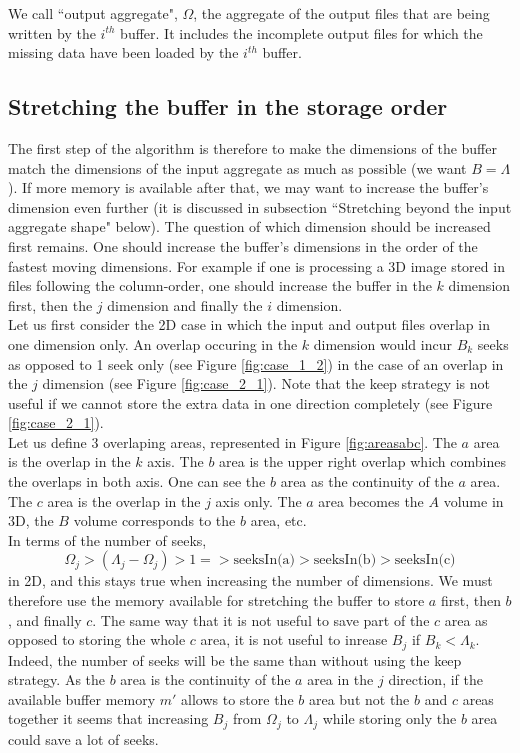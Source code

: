 \documentclass[conference]{IEEEtran}
\begin{document}
We call ``output aggregate", $\Omega$, the aggregate of the output files that are being written by the $i^{th}$ buffer. It includes the incomplete output files for which the missing data have been loaded by the $i^{th}$ buffer. \\

\subsection{Stretching the buffer in the storage order}
The first step of the algorithm is therefore to make the dimensions of the buffer match the dimensions of the input aggregate as much as possible (we want $B=\Lambda$).
If more memory is available after that, we may want to increase the buffer's dimension even further (it is discussed in subsection ``Stretching beyond the input aggregate shape" below).
The question of which dimension should be increased first remains.
One should increase the buffer's dimensions in the order of the fastest moving dimensions.
For example if one is processing a 3D image stored in files following the column-order, one should increase the buffer in the $k$ dimension first, then the $j$ dimension and finally the $i$ dimension. \\

Let us first consider the 2D case in which the input and output files overlap in one dimension only.
An overlap occuring in the $k$ dimension would incur $B_k$ seeks as opposed to 1 seek only (see Figure \ref{fig:case_1_2}) in the case of an overlap in the $j$ dimension (see Figure \ref{fig:case_2_1}).
Note that the keep strategy is not useful if we cannot store the extra data in one direction completely (see Figure \ref{fig:case_2_1}). \\

Let us define 3 overlaping areas, represented in Figure \ref{fig:areasabc}.
The $a$ area is the overlap in the $k$ axis.
The $b$ area is the upper right overlap which combines the overlaps in both axis.
One can see the $b$ area as the continuity of the $a$ area.
The $c$ area is the overlap in the $j$ axis only.
The $a$ area becomes the $A$ volume in 3D, the $B$ volume corresponds to the $b$ area, etc. \\

In terms of the number of seeks, $$\Omega_j > (\Lambda_j-\Omega_j) > 1 => \textrm{seeksIn(a)} > \textrm{seeksIn(b)} > \textrm{seeksIn(c)}$$ in 2D, and this stays true when increasing the number of dimensions.
We must therefore use the memory available for stretching the buffer to store $a$ first, then $b$, and finally $c$.
The same way that it is not useful to save part of the $c$ area as opposed to storing the whole $c$ area, it is not useful to inrease $B_j$ if $B_k < \Lambda_k$.
Indeed, the number of seeks will be the same than without using the keep strategy.
As the $b$ area is the continuity of the $a$ area in the $j$ direction, if the available buffer memory $m'$ allows to store the $b$ area but not the $b$ and $c$ areas together it seems that increasing $B_j$ from $\Omega_j$ to $\Lambda_j$ while storing only the $b$ area could save a lot of seeks. \\
\end{document}
